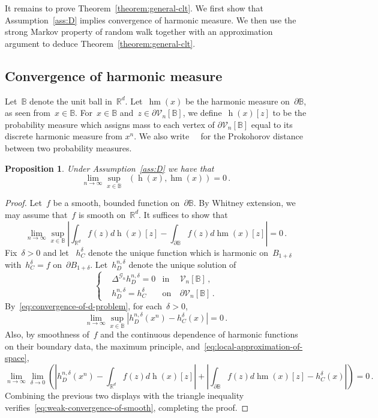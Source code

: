 \documentclass[12pt]{amsart}
\numberwithin{equation}{section}
\newtheorem{prop}[theorem]{Proposition}
\newcommand*{\Rd}{\ensuremath{\mathbb{R}^d}}
\newcommand{\G}{\mathcal{G}}
\newcommand{\V}{\mathcal{V}}
\newcommand{\B}{\mathbb{B}}
\DeclareMathOperator{\hm}{\mathop{hm}}
\DeclareMathOperator{\hmn}{\mathop{hm^{n}}}
\DeclareMathOperator{\dPr}{\mathop{d^{Pr}}}
\begin{document}
It remains to prove Theorem~\ref{theorem:general-clt}. We first show that Assumption~\ref{ass:D} implies convergence of harmonic measure. We then use the strong Markov property  of random walk together with an approximation argument to deduce Theorem~\ref{theorem:general-clt}. 




\subsection{Convergence of harmonic measure}
 Let~$\B$ denote the unit ball in~$\Rd$.
Let~$\hm(x)$ be the harmonic measure on~$\partial \B$, as seen from~$x \in \B$. For~$x \in \B$ and~$z \in \partial \V_n[\B]$, we define~$\hmn(x)[z]$ to be the probability measure which assigns 
mass to each vertex of $\partial\V_n[\B]$ equal to its discrete harmonic measure from $x^n$. We also write~$\dPr$ for the Prokohorov distance between two probability measures. 
 
 
\begin{prop} \label{prop:convergence-of-harmonic-measure}
	Under Assumption~\ref{ass:D}  we have that 
	\[
	\lim_{n \to \infty} \sup_{x \in \B} \dPr( \hmn(x), \hm(x)) = 0 \, . 
	\]
\end{prop}

\begin{proof}
	Let~$f$ be a smooth, bounded function on~$\partial \B$.	By Whitney extension, we may assume that~$f$ is smooth on~$\Rd$.
	It suffices to show that
	\begin{equation}
		\label{eq:weak-convergence-of-smooth}
	\lim_{n \to \infty}  \sup_{x \in \B} \left| \int_{\Rd} f(z) d \hmn(x)[z] - \int_{\partial \B} f(z) d \hm(x)[z] \right| = 0  \, .   
	\end{equation}
 	Fix~$\delta > 0$ and let 
	~$h_C^{\delta}$ denote the unique function which is harmonic on~$B_{1 + \delta}$ with~$h^{\delta}_C = f$ on~$\partial B_{1 + \delta}$. 
	Let~$h^{n,\delta}_D$ denote the unique solution of 	
	\[
	\left\{
	\begin{aligned}
		&  \Delta^{\G_n} h^{n,\delta}_D = 0 & \mbox{in} & \ \V_n[\B] \,,
		\\
		& h^{n,\delta}_D = h^{\delta}_C & \mbox{on} &  \ \partial \V_n[\B]    \, .
	\end{aligned}
	\right.
	\]
	By~\eqref{eq:convergence-of-d-problem}, for each~$\delta > 0$, 
	\[
	\lim_{n \to \infty } \sup_{x \in \B}|h^{n, \delta}_D(x^{n}) - h^{\delta}_C(x)|  = 0 \, . 
	\]
	Also, by smoothness of~$f$ and the continuous dependence of harmonic functions on their boundary data,
	 the maximum principle, and~\eqref{eq:local-approximation-of-space}, 
	\[
	\lim_{n \to \infty} \lim_{\delta \to 0}  \left(  \left| h^{n, \delta}_D(x^{n}) - \int_{\Rd} f(z) d \hmn(x)[z] \right| + \left| \int_{\partial \B} f(z) d \hm(x)[z] - h_C^{\delta}(x) \right| \right) = 0 \, . 
	\]
	Combining the previous two displays with the triangle inequality verifies~\eqref{eq:weak-convergence-of-smooth}, completing the proof. 
\end{proof}
\end{document}
